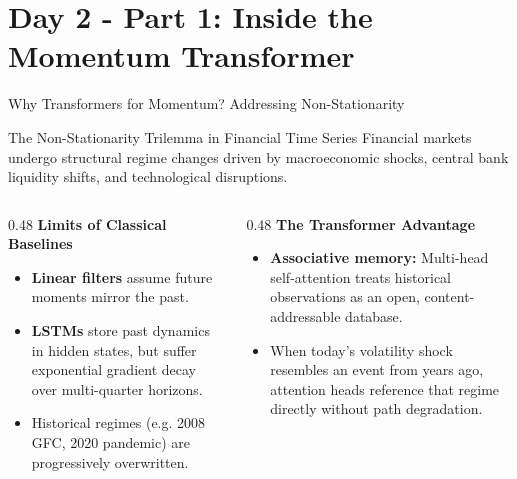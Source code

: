 \documentclass[10pt]{beamer}
\begin{document}
\section{Day 2 - Part 1: Inside the Momentum Transformer}

\begin{frame}{Why Transformers for Momentum? Addressing Non-Stationarity}
  \begin{block}{The Non-Stationarity Trilemma in Financial Time Series}
    Financial markets undergo structural regime changes driven by macroeconomic shocks, central bank liquidity shifts, and technological disruptions.
  \end{block}
  \vspace{0.1cm}
  \begin{columns}[t]
    \begin{column}{0.48\textwidth}
      \textbf{Limits of Classical Baselines}
      \begin{itemize}\scriptsize
        \item \textbf{Linear filters} assume future moments mirror the past.
        \item \textbf{LSTMs} store past dynamics in hidden states, but suffer exponential gradient decay over multi-quarter horizons.
        \item Historical regimes (e.g. 2008 GFC, 2020 pandemic) are progressively overwritten.
      \end{itemize}
    \end{column}
    \begin{column}{0.48\textwidth}
      \textbf{The Transformer Advantage}
      \begin{itemize}\scriptsize
        \item \textbf{Associative memory:} Multi-head self-attention treats historical observations as an open, content-addressable database.
        \item When today's volatility shock resembles an event from years ago, attention heads reference that regime directly without path degradation.
      \end{itemize}
    \end{column}
  \end{columns}
\end{frame}
\end{document}
